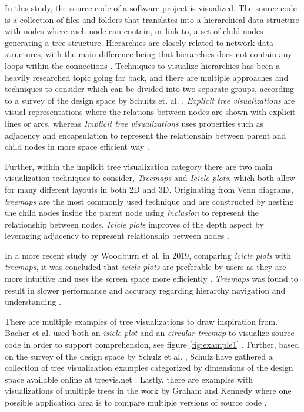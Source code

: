In this study, the source code of a software project is visualized.
The source code is a collection of files and folders that translates into a hierarchical data structure with nodes where each node can contain, or link to, a set of child nodes generating a tree-structure.
Hierarchies are closely related to network data structures, with the main difference being that hierarchies does not contain any loops within the connections \cite{spence_information_2014}.
Techniques to visualize hierarchies has been a heavily researched topic going far back, and there are multiple approaches and techniques to consider which can be divided into two separate groups, according to a survey of the design space by Schultz et. al. \cite{schulz_design_2011}.
\textit{Explicit tree visualizations} are visual representations where the relations between nodes are shown with explicit lines or arcs, whereas \textit{Implicit tree visualizations} uses properties such as adjacency and encapsulation to represent the relationship between parent and child nodes in more space efficient way \cite{schulz_design_2011}.

Further, within the implicit tree visualization category there are two main visualization techniques to consider, \textit{Treemaps} and \textit{Icicle plots}, which both allow for many different layouts in both 2D and 3D.
Originating from Venn diagrams, \textit{treemaps} are the most commonly used technique and are constructed by nesting the child nodes inside the parent node using \textit{inclusion} to represent the relationship between nodes.
\textit{Icicle plots} improves of the depth aspect by leveraging adjacency to represent relationship between nodes \cite{schulz_design_2011}.

In a more recent study by Woodburn et al. in 2019, comparing \textit{icicle plots} with \textit{treemaps}, it was concluded that \textit{icicle plots} are preferable by users as they are more intuitive and uses the screen space more efficiently \cite{woodburn_interactive_2019}.
\textit{Treemaps} was found to result in slower performance and accuracy regarding hierarchy navigation and understanding \cite{woodburn_interactive_2019}.

% 


There are multiple examples of tree visualizations to draw inspiration from.
Bacher et al. used both an \textit{isicle plot} and an \textit{circular treemap} to visualize source code in order to support comprehension, see figure \ref{fig:example1} \cite{bacher_using_2016}.
Further, based on the survey of the design space by Schulz et al. \cite{schulz_design_2011}, Schulz have gathered a collection of tree visualization examples categorized by dimensions of the design space available online at treevis.net \cite{schulz_treevisnet_2011}.
Lastly, there are examples with visualizations of multiple trees in the work by Graham and Kennedy where one possible application area is to compare multiple versions of source code \cite{graham_survey_2010}.
